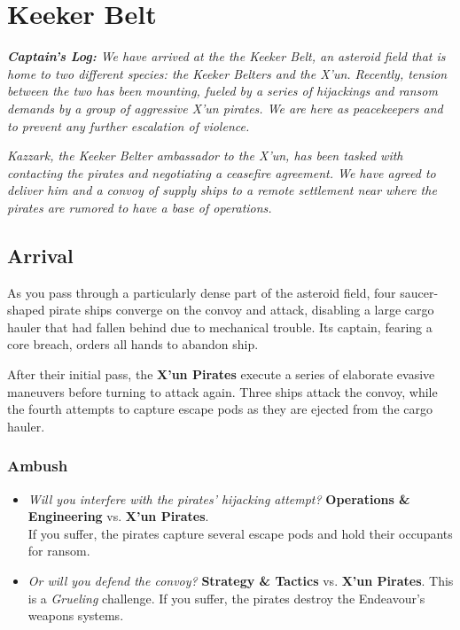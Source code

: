 \documentclass[11pt, a5paper, parskip=half-, DIV=12]{scrartcl}
\begin{document}
\section*{Keeker Belt}
\textit{\textbf{Captain's Log:} We have arrived at the the Keeker Belt, an asteroid field that is home to two different species: the Keeker Belters and the X'un. Recently, tension between the two has been mounting, fueled by a series of hijackings and ransom demands by a group of aggressive X'un pirates. We are here as peacekeepers and to prevent any further escalation of violence.}

\textit{Kazzark, the Keeker Belter ambassador to the X'un, has been tasked with contacting the pirates and negotiating a ceasefire agreement. We have agreed to deliver him and a convoy of supply ships to a remote settlement near where the pirates are rumored to have a base of operations.}

\subsection*{Arrival}


As you pass through a particularly dense part of the asteroid field, four saucer-shaped pirate ships converge on the convoy and attack, disabling a large cargo hauler that had fallen behind due to mechanical trouble.  Its captain, fearing a core breach, orders all hands to abandon ship. 

After their initial pass, the \textbf{X'un Pirates} execute a series of elaborate evasive maneuvers before turning to attack again. Three ships attack the convoy, while the fourth attempts to capture escape pods as they are ejected from the cargo hauler.

\subsubsection*{Ambush}
\begin{itemize}
	\item \textit{Will you interfere with the pirates' hijacking attempt?} \textbf{Operations \& Engineering} vs. \textbf{X'un Pirates}. \\ If you suffer, the pirates capture several escape pods and hold their occupants for ransom.
	\item \textit{Or will you defend the convoy?} \textbf{Strategy \& Tactics} vs. \textbf{X'un Pirates}. This is a \textit{Grueling} challenge. If you suffer, the pirates destroy the Endeavour's weapons systems. 
\end{itemize}
\end{document}
